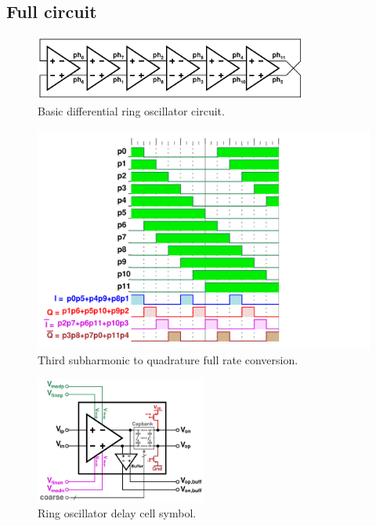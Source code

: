 		\subsection{Full circuit}
			\begin{figure}[htb!]
			        \centering
			        \includegraphics[width=0.8\textwidth, angle=0]{./figs/design/ro_6st_simple}
			    \caption{Basic differential ring oscillator circuit.}
			    \label{fig:basic_6stg_ro}
			\end{figure}
			\begin{figure}[htb!]
			        \centering
			        \includegraphics[width=1.0\textwidth, angle=0]{./figs/design/ro_12ph_quad}
			    \caption{Third subharmonic to quadrature full rate conversion.}
			    \label{fig:ro_phases}
			\end{figure}

			\begin{figure}[htb!]
			        \centering
			        \includegraphics[width=0.5\textwidth, angle=0]{./figs/design/delay_cell_symbol_full}
			    \caption{Ring oscillator delay cell symbol.}
			    \label{fig:delay_cell_symbol}
			\end{figure}

